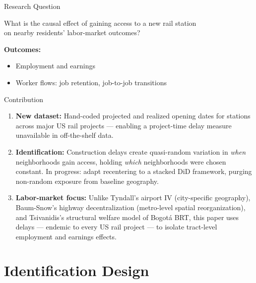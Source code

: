 \documentclass{beamer}
\begin{document}
\begin{frame}{Research Question}
\begin{center}
\large
What is the causal effect of gaining access to a new rail station \\
on nearby residents' labor-market outcomes?
\end{center}

\bigskip\bigskip
\textbf{Outcomes:}
\begin{itemize}
  \item Employment and earnings 
  \item Worker flows: job retention, job-to-job transitions
\end{itemize}

\end{frame}

\begin{frame}{Contribution}
\small
\begin{enumerate}
  \item \textbf{New dataset:} Hand-coded projected and realized opening dates for stations
        across major US rail projects --- enabling a project-time delay measure unavailable
        in off-the-shelf data.
  \item \textbf{Identification:} Construction delays create quasi-random variation in
        \emph{when} neighborhoods gain access, holding \emph{which} neighborhoods were
        chosen constant. In progress: adapt \textcite{borusyakNonrandomExposureExogenous2023}
        recentering to a stacked DiD framework, purging non-random exposure from baseline
        geography.
  \item \textbf{Labor-market focus:} Unlike Tyndall's airport IV (city-specific geography),
        Baum-Snow's highway decentralization (metro-level spatial reorganization), and
        Tsivanidis's structural welfare model of Bogotá BRT, this paper uses delays ---
        endemic to every US rail project --- to isolate tract-level employment and earnings effects.
\end{enumerate}
\end{frame}

\section{Identification Design}
\end{document}
